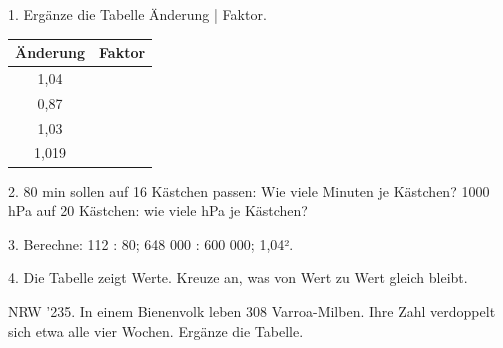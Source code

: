 \documentclass[11pt]{article}
\begin{document}
\pfheftstil
{}
\pfrueckblick
\begin{pfaufg}{}{1.}{}
Ergänze die Tabelle Änderung | Faktor.
\par\smallskip\noindent \begingroup\renewcommand{\arraystretch}{1.3}\begin{tabular}{|c|c|}\hline \textbf{Änderung} & \textbf{Faktor} \\ \hline 1,04 & \rule{0pt}{3ex}\hspace{1.6cm} \\ \hline 0,87 & \rule{0pt}{3ex}\hspace{1.6cm} \\ \hline 1,03 & \rule{0pt}{3ex}\hspace{1.6cm} \\ \hline 1,019 & \rule{0pt}{3ex}\hspace{1.6cm} \\ \hline\end{tabular}\endgroup\par
{}
\end{pfaufg}
\begin{pfaufg}{}{2.}{}
80 min sollen auf 16 Kästchen passen: Wie viele Minuten je Kästchen? 1000 hPa auf 20 Kästchen: wie viele hPa je Kästchen?
\end{pfaufg}
\begin{pfaufg}{}{3.}{}
Berechne: 112 : 80; 648 000 : 600 000; 1,04².
\end{pfaufg}
\pfgruppe{}
\begin{pfaufg}{}{4.}{}
Die Tabelle zeigt Werte. Kreuze an, was von Wert zu Wert gleich bleibt. 
\end{pfaufg}
\pfgruppe{}
\begin{pfaufg}{NRW ’23}{5.}{}
In einem Bienenvolk leben 308 Varroa-Milben. Ihre Zahl verdoppelt sich etwa alle vier Wochen. Ergänze die Tabelle.
\par\smallskip\noindent {}\par
{}
\end{pfaufg}
\pfgruppe{}
\end{document}
